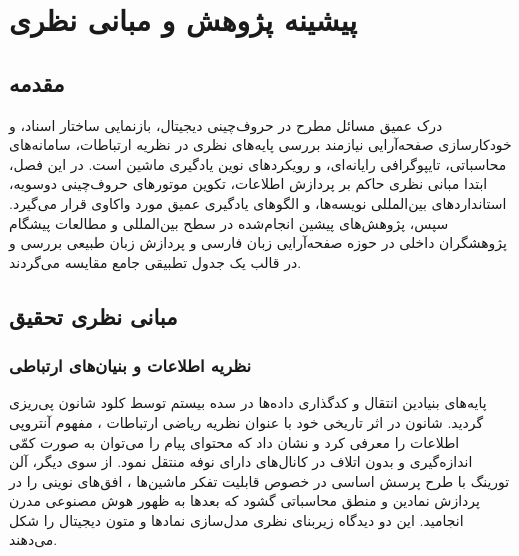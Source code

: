 
\chapter{پیشینه پژوهش و مبانی نظری}
\label{chap:literature}

\section{مقدمه}
\label{sec:ch2_intro}

درک عمیق مسائل مطرح در حروف‌چینی دیجیتال، بازنمایی ساختار اسناد، و خودکارسازی صفحه‌آرایی نیازمند بررسی پایه‌های نظری در نظریه ارتباطات، سامانه‌های محاسباتی، تایپوگرافی رایانه‌ای، و رویکردهای نوین یادگیری ماشین است. در این فصل، ابتدا مبانی نظری حاکم بر پردازش اطلاعات، تکوین موتورهای حروف‌چینی دوسویه، استانداردهای بین‌المللی نویسه‌ها، و الگوهای یادگیری عمیق مورد واکاوی قرار می‌گیرد. سپس، پژوهش‌های پیشین انجام‌شده در سطح بین‌المللی و مطالعات پیشگام پژوهشگران داخلی در حوزه صفحه‌آرایی زبان فارسی و پردازش زبان طبیعی بررسی و در قالب یک جدول تطبیقی جامع مقایسه می‌گردند.

\section{مبانی نظری تحقیق}
\label{sec:ch2_theory}

\subsection{نظریه اطلاعات و بنیان‌های ارتباطی}
پایه‌های بنیادین انتقال و کدگذاری داده‌ها در سده بیستم توسط کلود شانون پی‌ریزی گردید. شانون در اثر تاریخی خود با عنوان نظریه ریاضی ارتباطات \cite{shannon1948mathematical}، مفهوم آنتروپی اطلاعات را معرفی کرد و نشان داد که محتوای پیام را می‌توان به صورت کمّی اندازه‌گیری و بدون اتلاف در کانال‌های دارای نوفه منتقل نمود. از سوی دیگر، آلن تورینگ با طرح پرسش اساسی در خصوص قابلیت تفکر ماشین‌ها \cite{turing1950computing}، افق‌های نوینی را در پردازش نمادین و منطق محاسباتی گشود که بعدها به ظهور هوش مصنوعی مدرن انجامید. این دو دیدگاه زیربنای نظری مدل‌سازی نمادها و متون دیجیتال را شکل می‌دهند.

